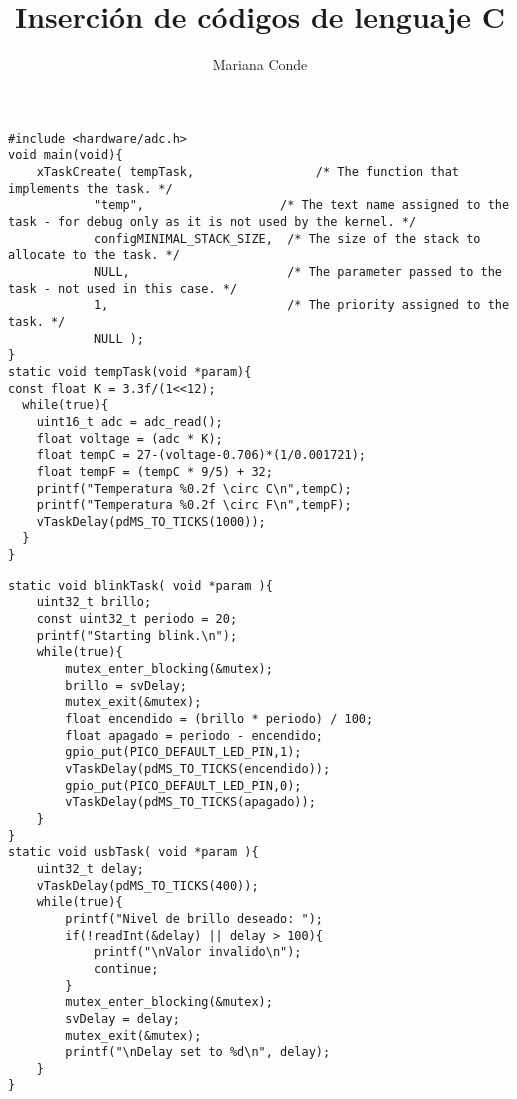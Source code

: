 \documentclass{article}
\title{Inserción de códigos de lenguaje C}
\author{Mariana Conde}
\date{}
\begin{document}
\maketitle

\begin{mdframed}[style=topbottomframe]
\begin{lstlisting}[caption={\textcolor{gray}{\textbf{main.c - Temperatura obtenida}}},label={lst:temperatura_blink}]
#include <hardware/adc.h>
void main(void){
    xTaskCreate( tempTask,                 /* The function that implements the task. */
            "temp",                   /* The text name assigned to the task - for debug only as it is not used by the kernel. */
            configMINIMAL_STACK_SIZE,  /* The size of the stack to allocate to the task. */
            NULL,                      /* The parameter passed to the task - not used in this case. */
            1,                         /* The priority assigned to the task. */
            NULL );  
}
static void tempTask(void *param){
const float K = 3.3f/(1<<12);
  while(true){
    uint16_t adc = adc_read();
    float voltage = (adc * K);
    float tempC = 27-(voltage-0.706)*(1/0.001721);
    float tempF = (tempC * 9/5) + 32;
    printf("Temperatura %0.2f \circ C\n",tempC);
    printf("Temperatura %0.2f \circ F\n",tempF);
    vTaskDelay(pdMS_TO_TICKS(1000));
  }
}
\end{lstlisting}
\end{mdframed}


\begin{mdframed}[style=topbottomframe]
\begin{lstlisting}[caption={\textcolor{gray}{\textbf{main.c - Atenuación del led centinela}}},label={lst:atenuacion_blink}]
static void blinkTask( void *param ){
    uint32_t brillo;
    const uint32_t periodo = 20;
    printf("Starting blink.\n");
    while(true){
        mutex_enter_blocking(&mutex);
        brillo = svDelay;
        mutex_exit(&mutex);
        float encendido = (brillo * periodo) / 100;
        float apagado = periodo - encendido;
        gpio_put(PICO_DEFAULT_LED_PIN,1);
        vTaskDelay(pdMS_TO_TICKS(encendido));        
        gpio_put(PICO_DEFAULT_LED_PIN,0);
        vTaskDelay(pdMS_TO_TICKS(apagado));        
    }
}
static void usbTask( void *param ){
    uint32_t delay;
    vTaskDelay(pdMS_TO_TICKS(400));
    while(true){
        printf("Nivel de brillo deseado: ");
        if(!readInt(&delay) || delay > 100){
            printf("\nValor invalido\n");
            continue;
        }
        mutex_enter_blocking(&mutex);
        svDelay = delay;
        mutex_exit(&mutex);
        printf("\nDelay set to %d\n", delay);
    }
}
\end{lstlisting}
\end{mdframed}
\end{document}
